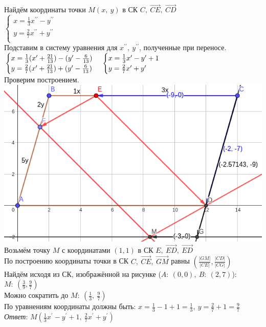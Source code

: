 Найдём координаты точки $M(x,~y)$ в СК $C,~\overrightarrow{CE},~\overrightarrow{CD}$ \\
	$
		\begin{cases}
			x = \frac{1}{3}x^{\prime\prime} - y^{\prime\prime} \\ 
			y = \frac{2}{7}x^{\prime\prime} + y^{\prime\prime} \\
		\end{cases}
	$ \\
Подставим в систему уравнения для $x^{\prime\prime},~y^{\prime\prime}$, полученные при переносе. \\
	$
		\begin{cases}
			x = \frac{1}{3}(x^\prime + \frac{21}{13}) - (y^\prime - \frac{6}{13}) \\ 
			y = \frac{2}{7}(x^\prime + \frac{21}{13}) + (y^\prime - \frac{6}{13}) \\
		\end{cases}
		\\
		\begin{cases}
			x = \frac{1}{3} x^\prime - y^\prime + 1 \\ 
			y = \frac{2}{7} x^\prime + y^\prime \\
		\end{cases}
	$ \\

Проверим построением. \\
\includegraphics[width=0.9\linewidth]{images/1_proverka.png} \\
Возьмём точку $M$ с координатами $(1, 1)$ в СК $E,~\overrightarrow{ED},~\overrightarrow{ED}$ \\
По построению координаты точки в СК $C,~\overrightarrow{CE},~\overrightarrow{GM}$ равны $(\frac{|GM|}{|CE|}, \frac{|CD|}{|CG|})$ \\
Найдём исходя из СК, изображённой на рисунке ($A:~(0, 0),~B:~(2, 7)$): $M:~(\frac{3}{9}, \frac{9}{7})$ \\
Можно сократить до $M:~(\frac{1}{3},~\frac{9}{7})$ \\
По уравнениям координаты должны быть: $x = \frac{1}{3} - 1 + 1 = \frac{1}{3},~y = \frac{2}{7} + 1 = \frac{9}{7}$ \\

\textit{Ответ}: $M(\frac{1}{3} x^\prime - y^\prime + 1,~\frac{2}{7} x^\prime + y^\prime )$
\clearpage
